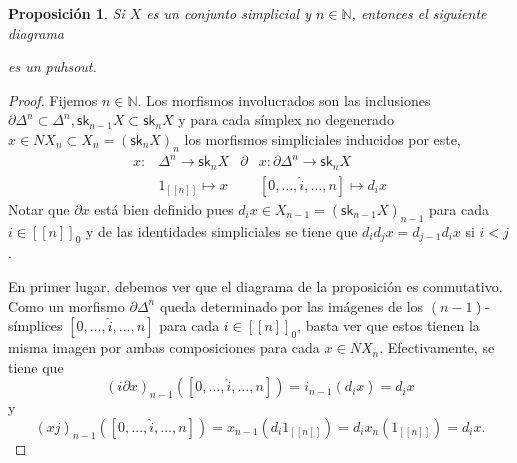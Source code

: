 \documentclass[11pt]{report}
\theoremstyle{colored}
\newtheorem{proposition}{Proposición}[section]
\newcommand{\N}{\mathbb{N}}
\newcommand{\nat}[1]{[\![#1]\!]}
\newcommand{\sk}{\mathsf{sk}}
\renewcommand{\ss}[1]{\Delta^{#1}}
\begin{document}
\begin{proposition}\label{sk-pushout} Si $X$ es un conjunto simplicial y $n \in \N$, entonces el siguiente diagrama
\begin{center}
\end{center}
es un puhsout.
\end{proposition}
\begin{proof} Fijemos $n \in \N$. Los morfismos involucrados son las inclusiones $\partial \ss{n} \subset \ss{n}, \sk_{n-1}X \subset \sk_nX$ y para cada símplex no degenerado $x \in NX_n \subset X_n = (\sk_nX)_n$ los morfismos simpliciales inducidos por este,
\begin{align*}
x \colon &\ss{n} \to \sk_n X &\partial& x \colon \partial \ss{n} \longrightarrow \sk_n X\\
&1_{\nat{n}} \mapsto x & &[0,\dots,\widehat{i},\dots,n] \mapsto d_ix
\end{align*}
Notar que $\partial x$ está bien definido pues $d_ix \in X_{n-1} = (\sk_{n-1}X)_{n-1}$ para cada $i \in \nat{n}_0$ y de las identidades simpliciales se tiene que $d_id_jx = d_{j-1}d_ix$ si $i < j$.

En primer lugar, debemos ver que el diagrama de la proposición es conmutativo. Como un morfismo $\partial \ss{n}$ queda determinado por las imágenes de los $(n-1)$-símplices $[0,\dots,\widehat{i},\dots,n]$ para cada $i \in \nat{n}_0$, basta ver que estos tienen la misma imagen por ambas composiciones para cada $x \in NX_n$. Efectivamente, se tiene que
\[
(i\partial x)_{n-1}([0,\dots,\widehat{i},\dots,n]) = i_{n-1}(d_ix) = d_ix
\]
y
\[
(xj)_{n-1}([0,\dots,\widehat{i},\dots,n]) = x_{n-1}(d_i1_{\nat{n}}) = d_ix_n(1_{\nat{n}}) = d_ix.
\]


\end{proof}
\end{document}
